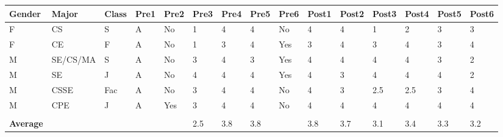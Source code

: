 \documentclass[12pt]{article}
\begin{document}
\begin{landscape}
\begin{center}
  \begin{tabular}{| l | l | l | l | l | l | l | l | l | l | l | l | l | l | l |}
    \hline

    \textbf{Gender} &
    \textbf{Major} &
    \textbf{Class} &
    \textbf{Pre1} &
    \textbf{Pre2} &
    \textbf{Pre3} &
    \textbf{Pre4} &
    \textbf{Pre5} &
    \textbf{Pre6} &
    \textbf{Post1} &
    \textbf{Post2} &
    \textbf{Post3} &
    \textbf{Post4} &
    \textbf{Post5} &
    \textbf{Post6} \\ \hline

    F &
    CS &
    S &
    A &
    No &
    1 &
    4 &
    4 &
    No &
    4 &
    4 &
    1 &
    2 &
    3 &
    3 \\ \hline

    F &
    CE &
    F &
    A &
    No &
    1 &
    3 &
    4 &
    Yes &
    3 &
    4 &
    3 &
    4 &
    3 &
    4 \\ \hline

    M &
    SE/CS/MA &
    S &
    A &
    No &
    3 &
    4 &
    3 &
    Yes &
    4 &
    4 &
    4 &
    4 &
    3 &
    2 \\ \hline

    M &
    SE &
    J &
    A &
    No &
    4 &
    4 &
    4 &
    Yes &
    4 &
    3 &
    4 &
    4 &
    4 &
    2 \\ \hline

    M &
    CSSE &
    Fac &
    A &
    No &
    3 &
    4 &
    4 &
    No &
    4 &
    3 &
    2.5 &
    2.5 &
    3 &
    4 \\ \hline

    M &
    CPE &
    J &
    A &
    Yes &
    3 &
    4 &
    4 &
    No &
    4 &
    4 &
    4 &
    4 &
    4 &
    4 \\ \hline

    & & & & & & & & & & & & & & \\ \hline

    \textbf{Average} &
    & & & &
    2.5 &
    3.8 &
    3.8 &
    &
    3.8 &
    3.7 &
    3.1 &
    3.4 &
    3.3 &
    3.2 \\ \hline

    
  \end{tabular}
\end{center}
\end{landscape}
\end{document}
